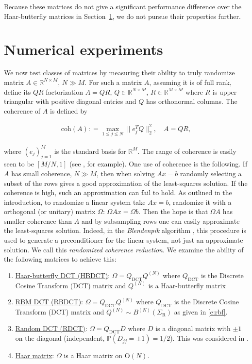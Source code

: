 Because these matrices do not give a significant performance difference over the Haar-butterfly matrices in Section~\ref{s:numerics}, we do not pursue their properties further.

\section{Numerical experiments}\label{s:numerics}

We now test classes of matrices by measuring their ability to truly randomize matrix $A \in \mathbb R^{N \times M}$, $N \gg M$.  For such a matrix $A$, assuming it is of full rank, define its $QR$ factorization $A = QR$, $Q \in \mathbb R^{N \times M}$, $R \in \mathbb R^{M\times M}$ where $R$ is upper triangular with positive diagonal entries and $Q$ has orthonormal columns.  The coherence of $A$ is defined by

\begin{align}
  \mathrm{coh}(A) : = \max_{1 \leq j \leq N} \| e_j^T Q\|_2^2, \quad A = QR,
\end{align}

where $(e_j)_{j=1}^M$ is the standard basis for $\mathbb R^M$.  The range of coherence is easily seen to be $[M/N,1]$ (see \cite{Ipsen2014}, for example).  One use of coherence is the following.  If $A$ has small coherence, $N \gg M$, then when solving $Ax = b$ randomly selecting a subset of the rows gives a good approximation of the least-squares solution.  If the coherence is high, such an approximation can fail to hold. As outlined in the introduction, to randomize a linear system take $Ax = b$, randomize it with a orthogonal (or unitary) matrix $\Omega$: $\Omega A x = \Omega b$.  Then the hope is that $\Omega A$ has smaller coherence than $A$ and by subsampling rows one can easily approximate the least-squares solution.  Indeed, in the \emph{Blendenpik} algorithm \cite{Avron2010}, this procedure is used to generate a preconditioner for the linear system, not just an approximate solution.  We call this \emph{randomized coherence reduction}.  We examine the ability of the following matrices to achieve this:

\begin{enumerate}
\item \underline{Haar-butterfly DCT (HBDCT)}: $\Omega = Q_{\mathrm{DCT}} Q^{(N)}$ where $Q_{\mathrm{DCT}}$ is the Discrete Cosine Transform (DCT) matrix and $Q^{(N)}$ is a Haar-butterfly matrix \item \underline{RBM DCT (RBDCT)}: $\Omega = Q_{\mathrm{DCT}} Q^{(N)}$ where $Q_{\mathrm{DCT}}$ is the Discrete Cosine Transform (DCT) matrix and $Q^{(N)} \sim B^{(N)}(\Sigma_{\mathrm R})$ as given in \eqref{e:rbf}.
\item \underline{Random DCT (RDCT)}:  $\Omega = Q_{\mathrm{DCT}} D$ where $D$ is a diagonal matrix with $\pm 1$ on the diagonal (independent, $\mathbb P( D_{jj} = \pm 1) = 1/2$).  This was considered in \cite{Avron2010}.
\item \underline{Haar matrix}: $\Omega$ is a Haar matrix on $\mathrm O(N)$.
\end{enumerate}

